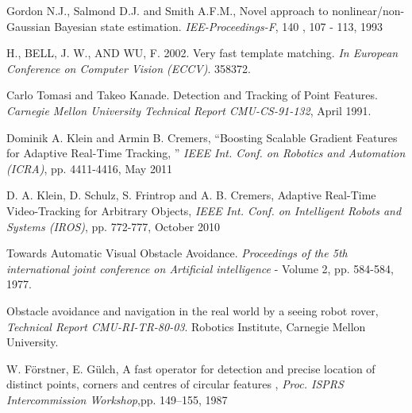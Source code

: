 \begin{thebibliography}{SMAT}
 Gordon N.J., Salmond D.J. and Smith A.F.M., Novel approach to nonlinear/non-Gaussian Bayesian state estimation. \textit{IEE-Proceedings-F}, 140 , 107 - 113, 1993

 H., BELL, J. W., AND WU, F. 2002. Very fast template matching. \textit{In European Conference on Computer Vision (ECCV)}. 358\textendash{}372.

Carlo Tomasi and Takeo Kanade. Detection and Tracking of Point Features. \textit{Carnegie Mellon University Technical Report CMU-CS-91-132}, April 1991.

 Dominik A. Klein and Armin B. Cremers, \textquotedblleft{}Boosting Scalable Gradient Features for Adaptive Real-Time Tracking, \textquotedblright{} \textit{IEEE Int. Conf. on Robotics and Automation (ICRA)}, pp. 4411-4416, May 2011

 D. A. Klein, D. Schulz, S. Frintrop and A. B. Cremers, Adaptive Real-Time Video-Tracking for Arbitrary Objects, \textit{IEEE Int. Conf. on Intelligent Robots and Systems (IROS)}, pp. 772-777, October 2010

 Towards Automatic Visual Obstacle Avoidance. \textit{Proceedings of the 5th international joint conference on Artificial intelligence} - Volume 2, pp. 584-584, 1977.

 Obstacle avoidance and navigation in the real world by a seeing robot rover, \textit{Technical Report CMU-RI-TR-80-03}. Robotics Institute, Carnegie Mellon University.

 W. Förstner, E. Gülch, A fast operator for detection and precise location of distinct points, corners and centres of circular features , \textit{Proc. ISPRS Intercommission Workshop},pp. 149–155, 1987
\end{thebibliography}